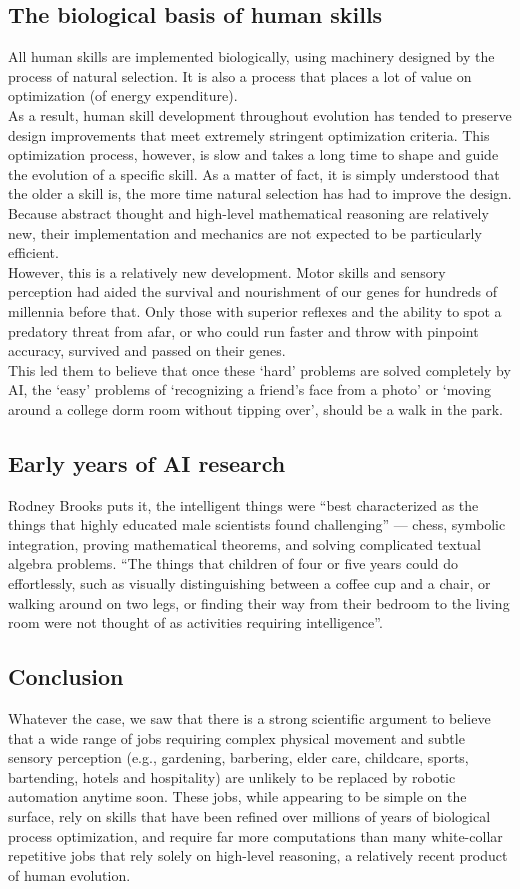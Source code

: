 \documentclass[13pt,letterpaper]{article}
\begin{document}
\subsection* {The biological basis of human skills} 
All human skills are implemented biologically, using machinery designed by the process of natural selection. It is also a process that places a lot of value on optimization (of energy expenditure).
\\
As a result, human skill development throughout evolution has tended to preserve design improvements that meet extremely stringent optimization criteria. This optimization process, however, is slow and takes a long time to shape and guide the evolution of a specific skill.
As a matter of fact, it is simply understood that the older a skill is, the more time natural selection has had to improve the design.
\\
Because abstract thought and high-level mathematical reasoning are relatively new, their implementation and mechanics are not expected to be particularly efficient.
\\
However, this is a relatively new development.
Motor skills and sensory perception had aided the survival and nourishment of our genes for hundreds of millennia before that. Only those with superior reflexes and the ability to spot a predatory threat from afar, or who could run faster and throw with pinpoint accuracy, survived and passed on their genes.
\\
This led them to believe that once these ‘hard’ problems are solved completely by AI, the ‘easy’ problems of ‘recognizing a friend’s face from a photo’ or ‘moving around a college dorm room without tipping over’, should be a walk in the park.
\subsection* {Early years of AI research}
Rodney Brooks puts it, the intelligent things were “best characterized as the things that highly educated male scientists found challenging” — chess, symbolic integration, proving mathematical theorems, and solving complicated textual algebra problems. “The things that children of four or five years could do effortlessly, such as visually distinguishing between a coffee cup and a chair, or walking around on two legs, or finding their way from their bedroom to the living room were not thought of as activities requiring intelligence”.

\subsection* {Conclusion}
Whatever the case, we saw that there is a strong scientific argument to believe that a wide range of jobs requiring complex physical movement and subtle sensory perception (e.g., gardening, barbering, elder care, childcare, sports, bartending, hotels and hospitality) are unlikely to be replaced by robotic automation anytime soon. These jobs, while appearing to be simple on the surface, rely on skills that have been refined over millions of years of biological process optimization, and require far more computations than many white-collar repetitive jobs that rely solely on high-level reasoning, a relatively recent product of human evolution.
\end{document}

